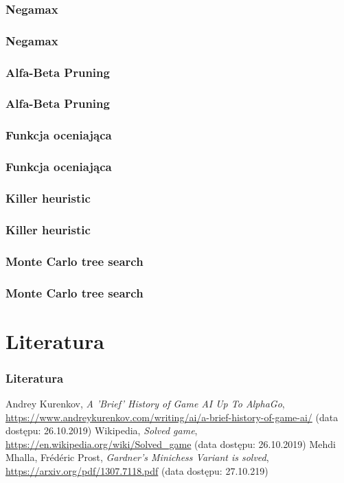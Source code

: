 \documentclass[polish,envcountsect,10pt]{beamer}
\begin{document}
            \subsubsection{Negamax}
                \begin{frame}
                    \frametitle{Negamax}
                \end{frame}
            \subsubsection{Alfa-Beta Pruning}
                \begin{frame}
                    \frametitle{Alfa-Beta Pruning}
                \end{frame}
            \subsubsection{Funkcja oceniająca}
                \begin{frame}
                    \frametitle{Funkcja oceniająca}
                \end{frame}
            \subsubsection{Killer heuristic}
                \begin{frame}
                    \frametitle{Killer heuristic}
                \end{frame}
            \subsubsection{Monte Carlo tree search}
                \begin{frame}
                    \frametitle{Monte Carlo tree search}
                \end{frame}
    \section{Literatura}
        \begin{frame}
            \frametitle{Literatura}
            \begin{thebibliography}{9}
                Andrey Kurenkov, \emph{A 'Brief' History of Game AI Up To AlphaGo}, \url{https://www.andreykurenkov.com/writing/ai/a-brief-history-of-game-ai/} (data dostępu: 26.10.2019)
                Wikipedia, \emph{Solved game}, \url{https://en.wikipedia.org/wiki/Solved_game} (data dostępu: 26.10.2019)
                Mehdi Mhalla, Fr\'ed\'eric Prost, \emph{Gardner’s Minichess Variant is solved}, \url{https://arxiv.org/pdf/1307.7118.pdf} (data dostępu: 27.10.219)
            \end{thebibliography}
        \end{frame}
\end{document}
